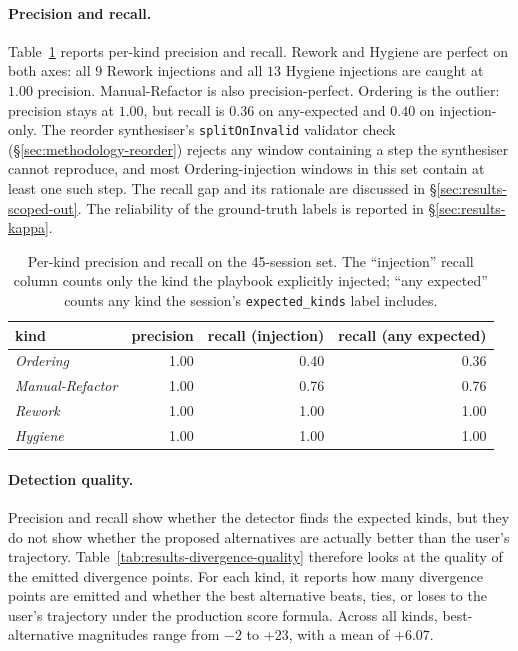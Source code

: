 \paragraph{Precision and recall.}
Table~\ref{tab:results-divergence-prec-recall} reports per-kind precision and recall. Rework and Hygiene are perfect on both axes: all $9$ Rework injections and all $13$ Hygiene injections are caught at $1.00$ precision. Manual-Refactor is also precision-perfect. Ordering is the outlier: precision stays at $1.00$, but recall is $0.36$ on any-expected and $0.40$ on injection-only. The reorder synthesiser's \texttt{splitOnInvalid} validator check (\S\ref{sec:methodology-reorder}) rejects any window containing a step the synthesiser cannot reproduce, and most Ordering-injection windows in this set contain at least one such step. The recall gap and its rationale are discussed in \S\ref{sec:results-scoped-out}. The reliability of the ground-truth labels is reported in \S\ref{sec:results-kappa}.

\begin{table}[htbp]
\centering
\small
\begin{tabular}{lrrr}
\hline
\textbf{kind} & \textbf{precision} & \textbf{recall (injection)} & \textbf{recall (any expected)} \\
\hline
\emph{Ordering}   & 1.00 & 0.40 & 0.36 \\
\emph{Manual-Refactor} & 1.00 & 0.76 & 0.76 \\
\emph{Rework}     & 1.00 & 1.00 & 1.00 \\
\emph{Hygiene}    & 1.00 & 1.00 & 1.00 \\
\hline
\end{tabular}
\caption{Per-kind precision and recall on the 45-session set. The ``injection'' recall column counts only the kind the playbook explicitly injected; ``any expected'' counts any kind the session's \texttt{expected\_kinds} label includes.}
\label{tab:results-divergence-prec-recall}
\end{table}

\paragraph{Detection quality.}
Precision and recall show whether the detector finds the expected kinds, but they do not show whether the proposed alternatives are actually better than the user's trajectory. Table~\ref{tab:results-divergence-quality} therefore looks at the quality of the emitted divergence points. For each kind, it reports how many divergence points are emitted and whether the best alternative beats, ties, or loses to the user's trajectory under the production score formula. Across all kinds, best-alternative magnitudes range from $-2$ to $+23$, with a mean of $+6.07$.

